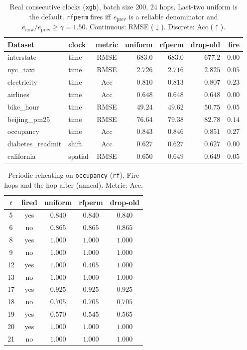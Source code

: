 \begin{table}[ht]\centering
\caption{Real consecutive clocks (\texttt{xgb}), batch size 200,
24 hops. Last-two uniform is the default. \texttt{rfperm} fires
iff $e_{\mathrm{prev}}$ is a reliable denominator and $e_{\mathrm{now}}/e_{\mathrm{prev}}\ge\gamma=1.50$.
Continuous: RMSE ($\downarrow$). Discrete: Acc ($\uparrow$).}
\label{tab:po-refit-real-xgb}
\small
\setlength{\tabcolsep}{3.2pt}
\begin{tabular}{@{}llcrrrr@{}}\toprule
Dataset & clock & metric & uniform & rfperm & drop-old & fire \\
\midrule
interstate & time & RMSE & $683.0$ & $683.0$ & $\mathbf{677.2}$ & $0.00$ \\
nyc\_taxi & time & RMSE & $2.726$ & $\mathbf{2.716}$ & $2.825$ & $0.05$ \\
electricity & time & Acc & $0.810$ & $\mathbf{0.813}$ & $0.807$ & $0.23$ \\
airlines & time & Acc & $\mathbf{0.648}$ & $\mathbf{0.648}$ & $\mathbf{0.648}$ & $0.00$ \\
bike\_hour & time & RMSE & $\mathbf{49.24}$ & $49.62$ & $50.75$ & $0.05$ \\
beijing\_pm25 & time & RMSE & $\mathbf{76.64}$ & $79.38$ & $82.78$ & $0.14$ \\
occupancy & time & Acc & $0.843$ & $0.846$ & $\mathbf{0.851}$ & $0.27$ \\
diabetes\_readmit & shift & Acc & $\mathbf{0.627}$ & $\mathbf{0.627}$ & $\mathbf{0.627}$ & $0.00$ \\
california & spatial & RMSE & $0.650$ & $\mathbf{0.649}$ & $\mathbf{0.649}$ & $0.05$ \\
\bottomrule
\end{tabular}
\end{table}

\begin{table}[ht]\centering
\caption{Periodic reheating on \texttt{occupancy} (\texttt{rf}).
Fire hops and the hop after (anneal). Metric: Acc.}
\label{tab:po-refit-periodic-occupancy-rf}
\small
\begin{tabular}{@{}ccccc@{}}\toprule
$t$ & fired & uniform & rfperm & drop-old \\
\midrule
5 & yes & $0.840$ & $0.840$ & $0.840$ \\
6 & no & $0.865$ & $0.865$ & $0.865$ \\
8 & yes & $1.000$ & $1.000$ & $1.000$ \\
9 & no & $1.000$ & $1.000$ & $1.000$ \\
12 & yes & $1.000$ & $0.405$ & $1.000$ \\
13 & no & $1.000$ & $1.000$ & $1.000$ \\
17 & yes & $0.925$ & $0.925$ & $0.925$ \\
18 & no & $0.705$ & $0.705$ & $0.705$ \\
19 & yes & $0.570$ & $0.545$ & $0.565$ \\
20 & yes & $1.000$ & $1.000$ & $1.000$ \\
21 & no & $1.000$ & $1.000$ & $1.000$ \\
\bottomrule
\end{tabular}
\end{table}

